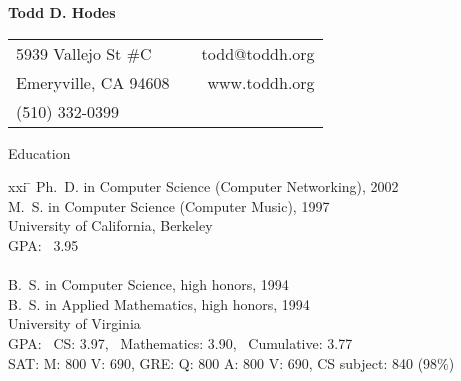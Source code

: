 \setlength{\oddsidemargin}{0.25 in}
\setlength{\evensidemargin}{-0.25 in}
\setlength{\topmargin}{-0.95 in}
\setlength{\textwidth}{6.5 in}
\setlength{\textheight}{10 in}
\setlength{\headsep}{0.35 in}
\setlength{\parindent}{0 in}
\setlength{\parskip}{0.01 in}


\addtolength{\evensidemargin}{-15pt}
\addtolength{\oddsidemargin}{-15pt}

\pagestyle{empty}


\begin{center} \bf
\Large
                               Todd D. Hodes
\medskip
\normalsize


\begin{tabular}{lp{3.6in}r}
5939 Vallejo St \#C  & & todd@toddh.org \\
Emeryville, CA  94608 & & www.toddh.org \\
(510) 332-0399 \\
\end{tabular}

\end{center}

\bigskip

\begin{bf} \large
Education \\[-18pt]
\end{bf}

\begin{tabbing}
xxi \= \kill
\>   Ph.\ D. in Computer Science (Computer Networking), 2002  \\
\>   M.\ S. in  Computer Science (Computer Music), 1997 \\
\>   University of California, Berkeley \\
\>   GPA:  \, 3.95 \\
\smallskip \\[-6pt]
\>   B.\ S. in Computer Science, high honors, 1994 \\
\>   B.\ S. in Applied Mathematics, high honors, 1994 \\
\>   University of Virginia \\
\>   GPA: \, CS: 3.97, \, Mathematics: 3.90, \, 
          Cumulative: 3.77 \\
\>   SAT: M: 800 V: 690, GRE: Q: 800 A: 800 V: 690, CS subject: 840 (98\%)\\
\end{tabbing}


